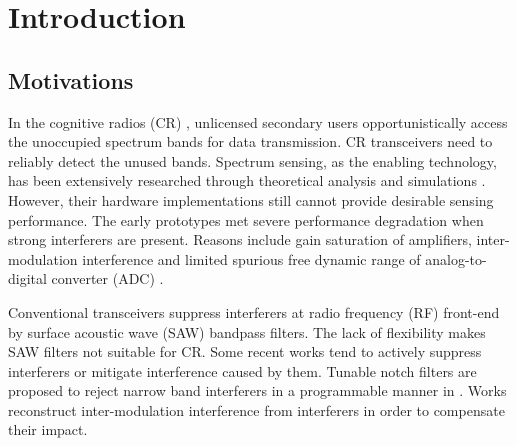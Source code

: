 \documentclass{IEEEtran}
\begin{document}

\section{Introduction}
\label{sec:Introduction}

\subsection{Motivations}
In the cognitive radios (CR) \cite{788210}, unlicensed secondary users opportunistically access the unoccupied spectrum bands for data transmission. CR transceivers need to reliably detect the unused bands. Spectrum sensing, as the enabling technology, has been extensively researched through theoretical analysis and simulations \cite{Hattab:2014bu,Axell:2012gs}. However, their hardware implementations still cannot provide desirable sensing performance. The early prototypes \cite{Yu:hm} met severe performance degradation when strong interferers are present. Reasons include gain saturation of amplifiers, inter-modulation interference and limited spurious free dynamic range of analog-to-digital converter (ADC) \cite{Razavi:2010jf}. 


Conventional transceivers suppress interferers at radio frequency (RF) front-end by surface acoustic wave (SAW) bandpass filters. The lack of flexibility makes SAW filters not suitable for CR. Some recent works tend to actively suppress interferers or mitigate interference caused by them. Tunable notch filters are proposed to reject narrow band interferers in a programmable manner in \cite{Ghaffari:2013fn}. Works \cite{rebeiz2015spectrum,Zou:cj,Grimm:2014bt} reconstruct inter-modulation interference from interferers in order to compensate their impact. 
\end{document}
